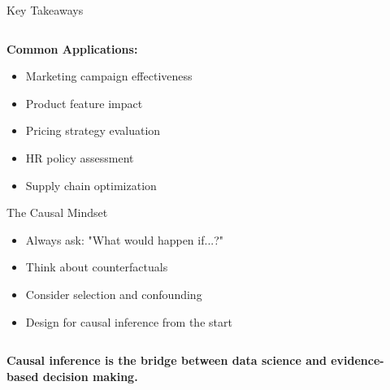 \documentclass[aspectratio=169,11pt]{beamer}
\begin{document}
\begin{frame}{Key Takeaways}
\begin{columns}
\begin{column}{0.5\textwidth}
\vspace{0.3cm}
\textbf{Common Applications:}
\begin{itemize}
\item Marketing campaign effectiveness
\item Product feature impact
\item Pricing strategy evaluation
\item HR policy assessment
\item Supply chain optimization
\end{itemize}

\vspace{0.3cm}
\begin{block}{The Causal Mindset}
\begin{itemize}
\item Always ask: "What would happen if...?"
\item Think about counterfactuals
\item Consider selection and confounding
\item Design for causal inference from the start
\end{itemize}
\end{block}
\end{column}
\end{columns}

\vspace{0.5cm}
\begin{center}
\textcolor{navyblue}{\Large \textbf{Causal inference is the bridge between data science and evidence-based decision making.}}
\end{center}
\end{frame}
\end{document}
